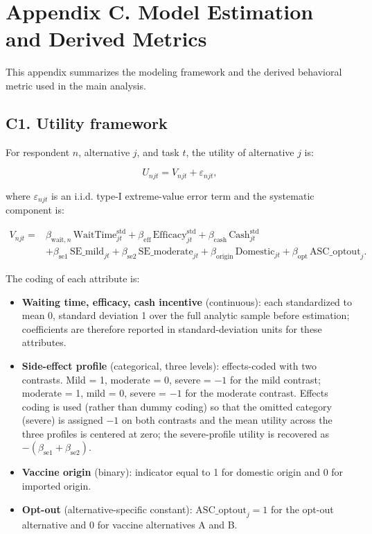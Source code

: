 \section*{Appendix C. Model Estimation and Derived Metrics}
\label{app:C}

This appendix summarizes the modeling framework and the derived behavioral metric used in the main analysis.

\subsection*{C1. Utility framework}

For respondent $n$, alternative $j$, and task $t$, the utility of alternative $j$ is:

\[
U_{njt} = V_{njt} + \varepsilon_{njt},
\]

where $\varepsilon_{njt}$ is an i.i.d. type-I extreme-value error term and the systematic component is:

\[
\begin{aligned}
V_{njt} ={}& \beta_{\text{wait},n}\, \text{WaitTime}^{\text{std}}_{jt}
 + \beta_{\text{eff}}\, \text{Efficacy}^{\text{std}}_{jt}
 + \beta_{\text{cash}}\, \text{Cash}^{\text{std}}_{jt} \\
 & + \beta_{\text{se1}}\, \text{SE\_mild}_{jt} + \beta_{\text{se2}}\, \text{SE\_moderate}_{jt}
 + \beta_{\text{origin}}\, \text{Domestic}_{jt}
 + \beta_{\text{opt}}\, \text{ASC\_optout}_{j}.
\end{aligned}
\]

\noindent The coding of each attribute is:

\begin{itemize}
    \item \textbf{Waiting time, efficacy, cash incentive} (continuous): each standardized to mean 0, standard deviation 1 over the full analytic sample before estimation; coefficients are therefore reported in standard-deviation units for these attributes.
    \item \textbf{Side-effect profile} (categorical, three levels): effects-coded with two contrasts. Mild = 1, moderate = 0, severe = $-1$ for the mild contrast; moderate = 1, mild = 0, severe = $-1$ for the moderate contrast. Effects coding is used (rather than dummy coding) so that the omitted category (severe) is assigned $-1$ on both contrasts and the mean utility across the three profiles is centered at zero; the severe-profile utility is recovered as $-(\beta_{\text{se1}} + \beta_{\text{se2}})$.
    \item \textbf{Vaccine origin} (binary): indicator equal to 1 for domestic origin and 0 for imported origin.
    \item \textbf{Opt-out} (alternative-specific constant): $\text{ASC\_optout}_j = 1$ for the opt-out alternative and 0 for vaccine alternatives A and B.
\end{itemize}

